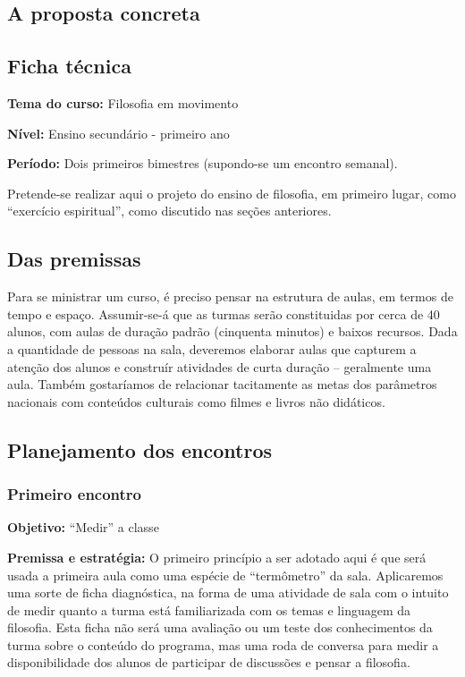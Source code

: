 \documentclass[12pt,a4paper]{article}
\newenvironment{citac}{
	\begin{addmargin}[4cm]{1em} \footnotesize}{\normalfont \end{addmargin}
}
\begin{document}
\begin{citac}
	\newpage
	
	\section{A proposta concreta}
	
	\subsection{Ficha técnica}

	\textbf{Tema do curso:} Filosofia em movimento

	\textbf{Nível:} Ensino secundário - primeiro ano

	\textbf{Período:} Dois primeiros bimestres (supondo-se um encontro
	semanal). 

	Pretende-se realizar aqui o projeto do ensino de filosofia, em 
	primeiro lugar, como “exercício espiritual”, como discutido nas 
	seções anteriores. 

	\subsection{Das premissas}

	Para se ministrar um curso, é preciso pensar na 
	estrutura de aulas, em termos de tempo e espaço. Assumir-se-á que 
	as turmas serão constituidas por cerca de 40 alunos, com aulas de 
	duração padrão (cinquenta minutos) e baixos recursos. 
	Dada a quantidade de 
	pessoas na sala, deveremos elaborar aulas que capturem a atenção dos 
	alunos e construír atividades de curta duração -- geralmente uma aula.
	Também gostaríamos de relacionar tacitamente as metas dos parâmetros 
	nacionais com 	conteúdos culturais como filmes 
	e livros não didáticos. 

	\subsection{Planejamento dos encontros}

	\subsubsection{Primeiro encontro}

	\textbf{Objetivo:} “Medir” a classe

	\textbf{Premissa e estratégia:}
	O primeiro princípio a ser adotado aqui é que será usada a primeira aula 
	como uma espécie de ``termômetro'' da sala. Aplicaremos uma sorte de 
	ficha diagnóstica, na forma de uma atividade de sala com o intuito 
	de medir quanto a turma está familiarizada com os temas e linguagem 
	da filosofia. Esta ficha não será uma avaliação ou um teste dos 
	conhecimentos da turma sobre o conteúdo do programa, mas uma roda de 
	conversa para medir a disponibilidade dos alunos de participar de 
	discussões e pensar a filosofia. 
	

\end{citac}
\end{document}
